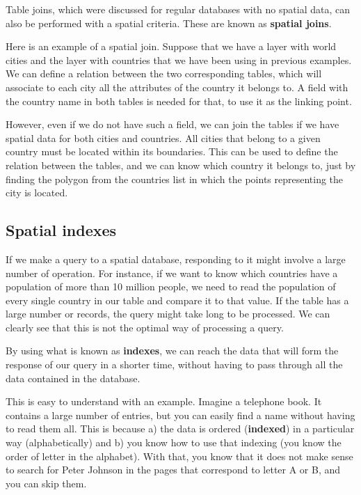 Table joins, which were discussed for regular databases with no spatial data, can also be performed with a spatial criteria. These are known as \textbf{spatial joins}.

Here is an example of a spatial join. Suppose that we have a layer with world cities and the layer with countries that we have been using in previous examples. We can define a relation between the two corresponding tables, which will associate to each city all the attributes of the country it belongs to. A field with the country name in both tables is needed for that, to use it as the linking point. 

However, even if we do not have such a field, we can join the tables if we have spatial data for both cities and countries. All cities that belong to a given country must be located within its boundaries. This can be used to define the relation between the tables, and we can know which country it belongs to, just by finding the polygon from the countries list in which the points representing the city is located.


\subsection{Spatial indexes}

If we make a query to a spatial database, responding to it might involve a large number of operation. For instance, if we want to know which countries have a population of more than 10 million people, we need to read the population of every single country in our table and compare it to that value. If the table has a large number or records, the query might take long to be processed. We can clearly see that this is not the optimal way of processing a query.

By using what is known as \textbf{indexes}, we can reach the data that will form the response of our query in a shorter time, without having to pass through all the data contained in the database.

This is easy to understand with an example. Imagine a telephone book. It contains a large number of entries, but you can easily find a name without having to read them all. This is because a) the data is ordered (\textbf{indexed}) in a particular way (alphabetically) and b) you know how to use that indexing (you know the order of letter in the alphabet). With that, you know that it does not make sense to search for Peter Johnson in the pages that correspond to letter A or B, and you can skip them.  

